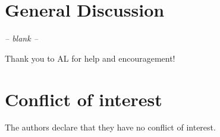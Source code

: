 \documentclass[smallextended, natbib]{svjour3}       %
\begin{document}
\section{General Discussion}
\begin{center}
\textit{-- blank --}
\end{center}



\begin{acknowledgements}
Thank you to AL for help and encouragement! 
\end{acknowledgements}

%
\section*{Conflict of interest}
The authors declare that they have no conflict of interest.

\end{document}
